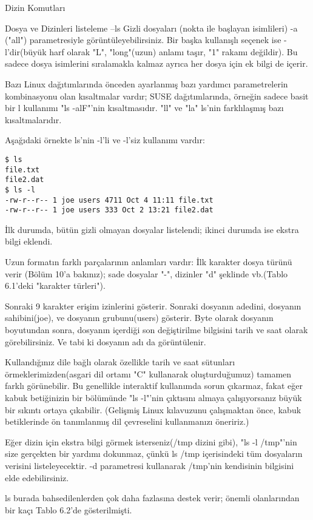 \documentclass[10pt,a5paper]{book}
\begin{document}
\begin{section}{Dizin Komutları}
\begin{subsection}{Dosya ve Dizinleri listeleme --ls}
	Gizli dosyaları (nokta ile başlayan isimlileri) -a ("all") parametresiyle görüntüleyebilirsiniz. Bir başka kullanışlı seçenek ise -l'dir(büyük harf olarak "L", "long"(uzun) anlamı taşır, "1" rakamı değildir). Bu sadece dosya isimlerini sıralamakla kalmaz ayrıca her dosya için ek bilgi de içerir.
	
	Bazı Linux dağıtımlarında önceden ayarlanmış bazı yardımcı parametrelerin kombinasyonu olan kısaltmalar vardır; SUSE dağıtımlarında, örneğin sadece basit bir l kullanımı "ls -alF"'nin kısaltmasıdır. "ll" ve "la" ls'nin farklılaşmış bazı kısaltmalarıdır.
	
Aşağıdaki örnekte ls'nin -l'li ve -l'siz kullanımı vardır:
\begin{verbatim}
$ ls
file.txt
file2.dat
$ ls -l
-rw-r--r-- 1 joe users 4711 Oct 4 11:11 file.txt
-rw-r--r-- 1 joe users 333 Oct 2 13:21 file2.dat
\end{verbatim}

İlk durumda, bütün gizli olmayan dosyalar listelendi; ikinci durumda ise ekstra bilgi eklendi.

	Uzun formatın farklı parçalarının anlamları vardır: İlk karakter dosya türünü verir (Bölüm 10'a bakınız); sade dosyalar "-", dizinler "d" şeklinde vb.(Tablo 6.1'deki "karakter türleri").
	
	Sonraki 9 karakter erişim izinlerini gösterir. Sonraki dosyanın adedini, dosyanın sahibini(joe), ve dosyanın grubunu(users) gösterir. Byte olarak dosyanın boyutundan sonra, dosyanın içerdiği son değiştirilme bilgisini tarih ve saat olarak görebilirsiniz. Ve tabi ki dosyanın adı da görüntülenir.
	
	Kullandığınız dile bağlı olarak özellikle tarih ve saat sütunları örmeklerimizden(asgari dil ortamı "C" kullanarak oluşturduğumuz) tamamen farklı görünebilir. Bu genellikle interaktif kullanımda sorun çıkarmaz, fakat eğer kabuk betiğinizin bir bölümünde "ls -l"'nin çıktısını almaya çalışıyorsanız büyük bir sıkıntı ortaya çıkabilir. (Gelişmiş Linux kılavuzunu çalışmaktan önce, kabuk betiklerinde ön tanımlanmış dil çevreselini kullanmanızı öneririz.)
	
	Eğer dizin için ekstra bilgi görmek isterseniz(/tmp dizini gibi), "ls -l /tmp"'nin size gerçekten bir yardımı dokunmaz, çünkü ls /tmp içerisindeki tüm dosyaların verisini listeleyecektir. -d parametresi kullanarak /tmp'nin kendisinin bilgisini elde edebilirsiniz.
	
ls burada bahsedilenlerden çok daha fazlasına destek verir; önemli olanlarından bir kaçı Tablo 6.2'de gösterilmişti.


\end{subsection}
\end{section}
\end{document}

